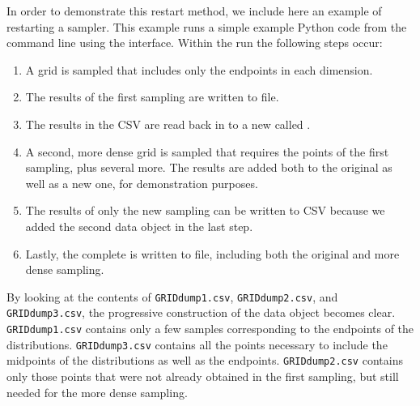In order to demonstrate this restart method, we include here an example of restarting a 
sampler.  This example runs a simple example Python code from the command line using the 
interface.  Within the run the following steps occur:
\begin{enumerate}
  \item A grid is sampled that includes only the endpoints in each dimension.
  \item The results of the first sampling are written to file.
  \item The results in the CSV are read back in to a new  called .
  \item A second, more dense grid is sampled that requires the points of the first sampling, plus several
    more.  The results are added both to the original  as well as a new one, for
    demonstration purposes.
  \item The results of only the new sampling can be written to CSV because we added the second data object in
    the last step.
  \item Lastly, the complete  is written to file, including both the original and more
    dense sampling.
\end{enumerate}
By looking at the contents of \texttt{GRIDdump1.csv}, \texttt{GRIDdump2.csv}, and \texttt{GRIDdump3.csv}, the
progressive construction of the data object becomes clear.  \texttt{GRIDdump1.csv} contains only a few samples
corresponding to the endpoints of the distributions.  \texttt{GRIDdump3.csv} contains all the points necessary
to include the midpoints of the distributions as well as the endpoints.  \texttt{GRIDdump2.csv} contains only
those points that were not already obtained in the first sampling, but still needed for the more dense
sampling.


